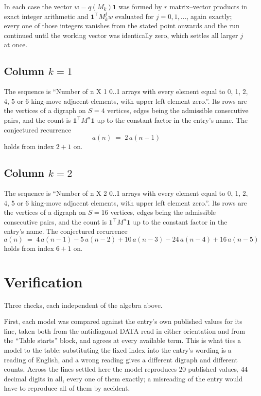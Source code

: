 \documentclass[11pt,a4paper]{article}
\theoremstyle{plain}
\theoremstyle{definition}
\begin{document}
In each case the vector $w=q(M_k)\mathbf{1}$ was formed by $r$ matrix--vector products in
exact integer arithmetic and $\mathbf{1}^{\!\top}M_k^{j}w$ evaluated for $j=0,1,\dots$,
again exactly; every one of those integers vanishes from the stated point onwards and the run
continued until the working vector was identically zero, which settles all larger $j$ at once.

\subsection*{Column $k$$=1$}
The sequence is ``Number of n X 1 0..1 arrays with every element equal to 0, 1, 2, 4, 5 or 6 king-move adjacent elements, with upper left element zero.''. Its rows are the vertices of a digraph on
$S=4$ vertices, edges being the admissible consecutive pairs, and the count is
$\mathbf{1}^{\!\top}M^{n}\mathbf{1}$ up to the constant factor in the entry's name.
The conjectured recurrence
\[
a(n)\;=\;2\,a(n-1)
\]
holds from index $2+1$ on.

\subsection*{Column $k$$=2$}
The sequence is ``Number of n X 2 0..1 arrays with every element equal to 0, 1, 2, 4, 5 or 6 king-move adjacent elements, with upper left element zero.''. Its rows are the vertices of a digraph on
$S=16$ vertices, edges being the admissible consecutive pairs, and the count is
$\mathbf{1}^{\!\top}M^{n}\mathbf{1}$ up to the constant factor in the entry's name.
The conjectured recurrence
\[
a(n)\;=\;4\,a(n-1) - 5\,a(n-2) + 10\,a(n-3) - 24\,a(n-4) + 16\,a(n-5)
\]
holds from index $6+1$ on.

\section{Verification}

Three checks, each independent of the algebra above.

First, each model was compared against the entry's own published values for its line, taken
both from the antidiagonal DATA read in either orientation and from the ``Table starts''
block, and agrees at every available term. This is what ties a model to the table:
substituting the fixed index into the entry's wording is a reading of English, and a wrong
reading gives a different digraph and different counts. Across the lines settled here the
model reproduces $20$ published values, $44$ decimal digits in all, every one of
them exactly; a misreading of the entry would have to reproduce all of them by accident.
\end{document}

